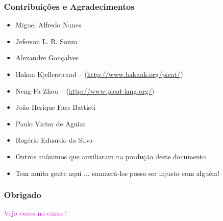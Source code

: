 \begin{frame}[fragile]
  \frametitle{Contribuições e Agradecimentos}

  \begin{itemize}
  \item Miguel Alfredo Nunes
  \item Jeferson L. R. Souza
    \item Alexandre Gonçalves 
    \item Hakan Kjellerstrand -- (\url{http://www.hakank.org/picat/})
    \item Neng-Fa Zhou -- (\url{http://www.picat-lang.org/})
    \item João Herique Faes Battisti
    \item Paulo Victor de Aguiar
    \item Rogério Eduardo da Silva
    \item Outros anônimos que auxiliaram na produção deste documento
    \item Tem muita gente aqui ... enumerá-los posso ser injusto com alguém!
  \end{itemize}

\end{frame}


\begin{frame}[fragile]
  \frametitle{Obrigado}

\begin{LARGE}
\begin{center}
\textcolor{magenta}{Vejo voces no curso !}
\end{center}
\end{LARGE}

\end{frame}
						
